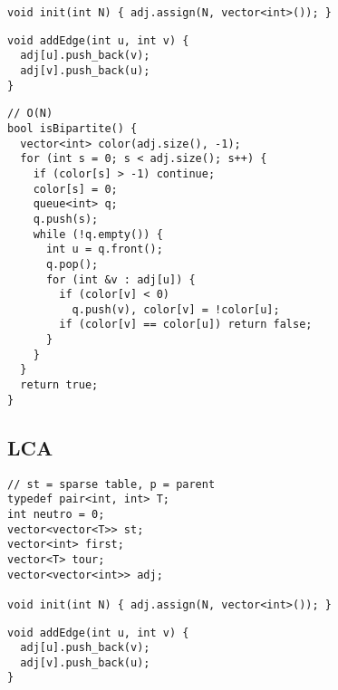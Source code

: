 \documentclass[twoside]{article}
\begin{document}
\begin{multicols*}{2}
\begin{verbatim}
void init(int N) { adj.assign(N, vector<int>()); }
\end{verbatim}
\vspace{-12pt}
\begin{verbatim}
void addEdge(int u, int v) {
  adj[u].push_back(v);
  adj[v].push_back(u);
}
\end{verbatim}
\vspace{-12pt}
\begin{verbatim}
// O(N)
bool isBipartite() {
  vector<int> color(adj.size(), -1);
  for (int s = 0; s < adj.size(); s++) {
    if (color[s] > -1) continue;
    color[s] = 0;
    queue<int> q;
    q.push(s);
    while (!q.empty()) {
      int u = q.front();
      q.pop();
      for (int &v : adj[u]) {
        if (color[v] < 0)
          q.push(v), color[v] = !color[u];
        if (color[v] == color[u]) return false;
      }
    }
  }
  return true;
}
\end{verbatim}

\subsectionfont{\large\bfseries\sffamily\underline}
\subsection*{LCA}
\begin{verbatim}
// st = sparse table, p = parent
typedef pair<int, int> T;
int neutro = 0;
vector<vector<T>> st;
vector<int> first;
vector<T> tour;
vector<vector<int>> adj;

void init(int N) { adj.assign(N, vector<int>()); }
\end{verbatim}
\vspace{-12pt}
\begin{verbatim}
void addEdge(int u, int v) {
  adj[u].push_back(v);
  adj[v].push_back(u);
}


\end{verbatim}
\end{multicols*}
\end{document}

